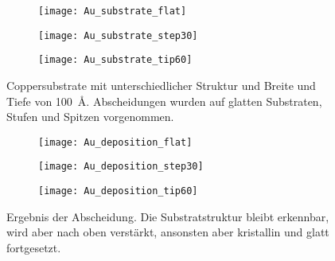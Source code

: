 \begin{figure}[bt]
  \captionsetup[subfigure]{singlelinecheck=false}
  \def\subfigwidth{0.31\textwidth}
  \begin{subfigure}[t]{\subfigwidth}
    \texttt{[image: Au\_substrate\_flat]}
    \label{fig:coppersubstrate-a}
  \end{subfigure}
  \hfill
  \begin{subfigure}[t]{\subfigwidth}
    \texttt{[image: Au\_substrate\_step30]}
    \label{fig:coppersubstrate-b}
  \end{subfigure}
  \hfill
  \begin{subfigure}[t]{\subfigwidth}
    \texttt{[image: Au\_substrate\_tip60]}
    \label{fig:coppersubstrate-c}
  \end{subfigure}
  \caption[Strukturierte Coppersubstrate]{Coppersubstrate mit unterschiedlicher Struktur und Breite und Tiefe von \SI{100}{\angstrom}.
    Abscheidungen wurden auf glatten Substraten, Stufen und Spitzen vorgenommen.}
  \label{fig:coppersubstrate}
\end{figure}

\begin{figure}[bt]
  \captionsetup[subfigure]{singlelinecheck=false}
  \def\subfigwidth{0.31\textwidth}
  \begin{subfigure}[t]{\subfigwidth}
    \texttt{[image: Au\_deposition\_flat]}
    \label{fig:copperdepositions-a}
  \end{subfigure}
  \hfill
  \begin{subfigure}[t]{\subfigwidth}
    \texttt{[image: Au\_deposition\_step30]}
    \label{fig:copperdepositions-b}
  \end{subfigure}
  \hfill
  \begin{subfigure}[t]{\subfigwidth}
    \texttt{[image: Au\_deposition\_tip60]}
    \label{fig:copperdepositions-c}
  \end{subfigure}
  \caption[Abscheidung auf strukturierten Substraten]{
    Ergebnis der Abscheidung.
    Die Substratstruktur bleibt erkennbar, wird aber nach oben verstärkt, ansonsten aber kristallin und glatt fortgesetzt.
  }
  \label{fig:copperdepositions}
\end{figure}

